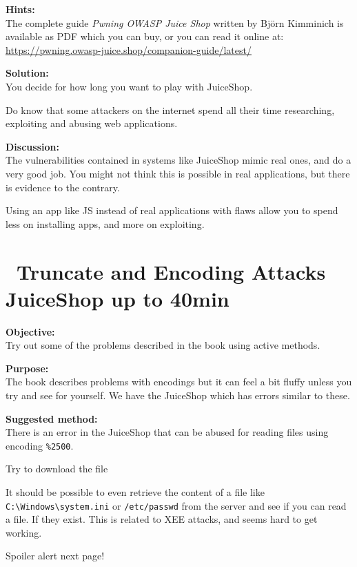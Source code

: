 \documentclass[a4paper,11pt,notitlepage]{report}
\begin{document}
 {\bf Hints:}\\
 The complete guide \emph{Pwning OWASP Juice Shop}
written by Björn Kimminich is available as PDF which you can buy, or you can read it online at:\\
\url{https://pwning.owasp-juice.shop/companion-guide/latest/}

 {\bf Solution:}\\
 You decide for how long you want to play with JuiceShop.

 Do know that some attackers on the internet spend all their time researching, exploiting and abusing web applications.

 {\bf Discussion:}\\
The vulnerabilities contained in systems like JuiceShop mimic real ones, and do a very good job. You might not think this is possible in real applications, but there is evidence to the contrary.

Using an app like JS instead of real applications with flaws allow you to spend less on installing apps, and more on exploiting.




\chapter{\faExclamationTriangle\ Truncate and Encoding Attacks JuiceShop up to 40min}
\label{ex:truncate-encoding}

{\bf Objective:}\\
Try out some of the problems described in the book using active methods.

{\bf Purpose:}\\
The book describes problems with encodings but it can feel a bit fluffy unless you try and see for yourself. We have the JuiceShop which has errors similar to these.

{\bf Suggested method:}\\
There is an error in the JuiceShop that can be abused for reading files using encoding \verb+%2500+.

Try to download the file 


It should be possible to even retrieve the content of a file like \verb+C:\Windows\system.ini+ or
\verb+/etc/passwd+ from the server and see if you can read a file. If they exist. This is related to XEE attacks, and seems hard to get working.

Spoiler alert next page!
\eject
\end{document}
